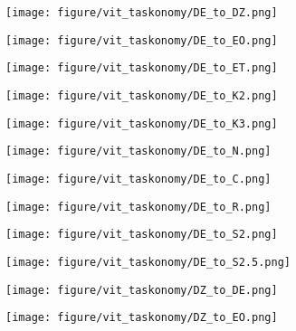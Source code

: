 \def\figlength{0.14}
\begin{figure}[h]
\centering  
\begin{subfigure}{\figlength\textwidth}
\texttt{[image: figure/vit\_taskonomy/DE\_to\_DZ.png]}
\end{subfigure}
\begin{subfigure}{\figlength\textwidth}
\texttt{[image: figure/vit\_taskonomy/DE\_to\_EO.png]}
\end{subfigure}
\begin{subfigure}{\figlength\textwidth}
\texttt{[image: figure/vit\_taskonomy/DE\_to\_ET.png]}
\end{subfigure}
\begin{subfigure}{\figlength\textwidth}
\texttt{[image: figure/vit\_taskonomy/DE\_to\_K2.png]}
\end{subfigure}
\begin{subfigure}{\figlength\textwidth}
\texttt{[image: figure/vit\_taskonomy/DE\_to\_K3.png]}
\end{subfigure}
\begin{subfigure}{\figlength\textwidth}
\texttt{[image: figure/vit\_taskonomy/DE\_to\_N.png]}
\end{subfigure}
\begin{subfigure}{\figlength\textwidth}
\texttt{[image: figure/vit\_taskonomy/DE\_to\_C.png]}
\end{subfigure}
\begin{subfigure}{\figlength\textwidth}
\texttt{[image: figure/vit\_taskonomy/DE\_to\_R.png]}
\end{subfigure}
\begin{subfigure}{\figlength\textwidth}
\texttt{[image: figure/vit\_taskonomy/DE\_to\_S2.png]}
\end{subfigure}
\begin{subfigure}{\figlength\textwidth}
\texttt{[image: figure/vit\_taskonomy/DE\_to\_S2.5.png]}
\end{subfigure}
\begin{subfigure}{\figlength\textwidth}
\texttt{[image: figure/vit\_taskonomy/DZ\_to\_DE.png]}
\end{subfigure}
\begin{subfigure}{\figlength\textwidth}
\texttt{[image: figure/vit\_taskonomy/DZ\_to\_EO.png]}

\end{subfigure}
\end{figure}
